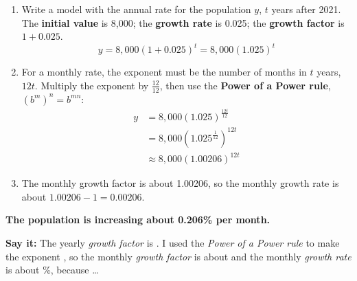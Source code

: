 \begin{minipage}[t]{0.58\textwidth}
\vspace{0pt}
\begin{enumerate}[label=\textbf{\arabic*.}, itemsep=3pt]
\item Write a model with the annual rate for the population $y$, $t$ years after 2021. The \textbf{initial value} is 8,000; the \textbf{growth rate} is 0.025; the \textbf{growth factor} is $1+0.025$.
\[y=8{,}000(1+0.025)^t=8{,}000(1.025)^t\]
\item For a monthly rate, the exponent must be the number of months in $t$ years, $12t$. Multiply the exponent by $\frac{12}{12}$, then use the \textbf{Power of a Power rule}, $\left(b^m\right)^n=b^{mn}$:
\begin{align*}
y&=8{,}000(1.025)^{\frac{12t}{12}}\\
&=8{,}000\left(1.025^{\frac{1}{12}}\right)^{12t}\\
&\approx8{,}000(1.00206)^{12t}
\end{align*}
\item The monthly growth factor is about 1.00206, so the monthly growth rate is about $1.00206-1=0.00206$.
\end{enumerate}
\end{minipage}\hfill
\begin{minipage}[t]{0.38\textwidth}
\vspace{0pt}

\vspace{6pt}
\end{minipage}

\textbf{The population is increasing about 0.206\% per month.}

\textbf{Say it:} The yearly \emph{growth factor} is \blank[1.6cm]. I used the \emph{Power of a Power rule} to make the exponent \blank[1.4cm], so the monthly \emph{growth factor} is about \blank[1.8cm] and the monthly \emph{growth rate} is about \blank[1.6cm]\%, because \dots\lines[1]

\newpage

